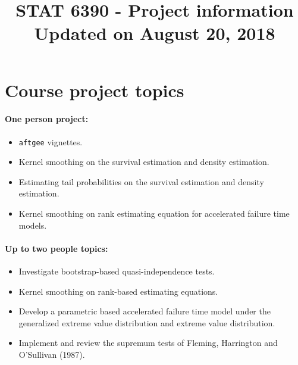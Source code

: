 \documentclass[a4paper,10pt]{article}
\title{STAT 6390 - Project information\\\vspace{.5cm}
\normalsize	Updated on August 20, 2018}
\date{}
\begin{document}
\maketitle
\section*{Course project topics}
\paragraph{One person project:}
\begin{itemize}
\item \texttt{aftgee} vignettes.
\item Kernel smoothing on the survival estimation and density estimation.
\item Estimating tail probabilities on the survival estimation and density estimation.
\item Kernel smoothing on rank estimating equation for accelerated failure time models.
\end{itemize}
\paragraph{Up to two people topics:}
\begin{itemize}
\item Investigate bootstrap-based quasi-independence tests. 
\item Kernel smoothing on rank-based estimating equations.
\item Develop a parametric based accelerated failure time model under the generalized extreme value distribution and extreme value distribution.
\item Implement and review the supremum tests of Fleming, Harrington and O'Sullivan (1987).
\end{itemize}

\newpage
\end{document}

